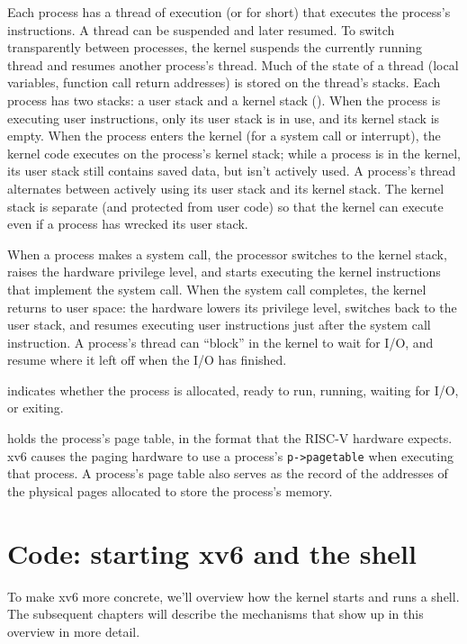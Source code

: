Each process has a thread of execution (or 
for short) that executes the process's instructions.
A thread can be suspended and later resumed.
To switch transparently between processes,
the kernel suspends the currently running thread and resumes another process's
thread.  Much of the state of a thread (local variables, function call return
addresses) is stored on the thread's stacks.
Each process has two stacks: a user stack and a kernel stack
().
When the process is executing user instructions, only its user stack
is in use, and its kernel stack is empty.
When the process enters the kernel (for a system call or interrupt),
the kernel code executes on the process's kernel stack; while
a process is in the kernel, its user stack still contains saved
data, but isn't actively used.
A process's thread alternates between actively using its user stack
and its kernel stack. The kernel stack is separate (and protected from
user code) so that the kernel
can execute even if a process has wrecked its user stack.

When a process makes a system call, the processor switches to the 
kernel stack, raises the hardware privilege level, and starts
executing the kernel instructions that implement the system call.
When the system call completes, the kernel returns to user space:
the hardware lowers its privilege level, switches back to the
user stack, and resumes executing user instructions just after
the system call instruction.
A process's thread
can ``block'' in the kernel to wait for I/O, and resume where it left
off when the I/O has finished.

indicates whether the process is allocated, ready
to run, running, waiting for I/O, or exiting.

holds the process's page table, in the format
that the RISC-V hardware expects.
xv6 causes the paging hardware to use a process's
\lstinline{p->pagetable}
when executing that process.
A process's page table also serves as the record of the
addresses of the physical pages allocated to store the process's memory.
\section{Code: starting xv6 and the shell}
To make xv6 more concrete, we'll overview how the kernel starts and
runs a shell. The subsequent chapters will describe the mechanisms
that show up in this overview in more detail.

